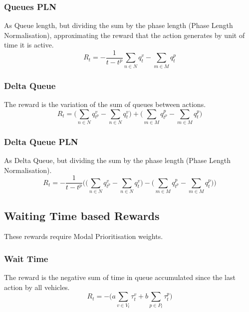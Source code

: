 \documentclass[a4paper, conference]{IEEEtran}
\begin{document}
\subsubsection{Queues PLN}
As Queue length, but dividing the sum by the phase length (Phase Length Normalisation), approximating the reward that the action generates by unit of time it is active.
\begin{equation}
    R_t = - \frac{1}{t-t^p}  \sum_{n \in N} q^v_{t} -  \sum_{m \in M} q^p_{t}
    \label{queuepln}
\end{equation}

\subsubsection{Delta Queue}
The reward is the variation of the sum of queues between actions.
\begin{equation}
    R_t =  \bigg( \sum_{n \in N} q^v_{t^p} -\sum_{n \in N} q^v_{t} \bigg) +  \bigg( \sum_{m \in M} q^p_{t^p} - \sum_{m \in M} q^p_{t} \bigg)
    \label{deltaqueue}
\end{equation}

\subsubsection{Delta Queue PLN}
As Delta Queue, but dividing the sum by the phase length (Phase Length Normalisation).
\begin{equation}
    R_t = - \frac{1}{t-t^p} \bigg(  \big( \sum_{n \in N} q^v_{t^p} - \sum_{n \in N} q^v_{t} \big) - 
    \big(  \sum_{m \in M} q^p_{t^p}  - \sum_{m \in M} q^p_{t} \big) \bigg)
    \label{deltaqueuepln}
\end{equation}

\subsection{Waiting Time based Rewards}
These rewards require Modal Prioritisation weights.
\subsubsection{Wait Time}
The reward is the negative sum of time in queue accumulated since the last action by all vehicles. 
\begin{equation}
R_t = - \bigg(a \sum_{v \in V_t} \tau^v_{t} + b \sum_{p \in P_t} \tau^p_{t} \bigg)
\label{eq:wait_time}
\end{equation}
\end{document}
